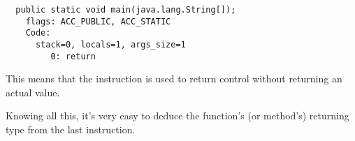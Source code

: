 \begin{lstlisting}
  public static void main(java.lang.String[]);
    flags: ACC_PUBLIC, ACC_STATIC
    Code:
      stack=0, locals=1, args_size=1
         0: return        
\end{lstlisting}

This means that the  instruction is used to return control without returning 
an actual value.

Knowing all this, it's very easy to deduce the function's (or method's) returning type 
from the last instruction.

